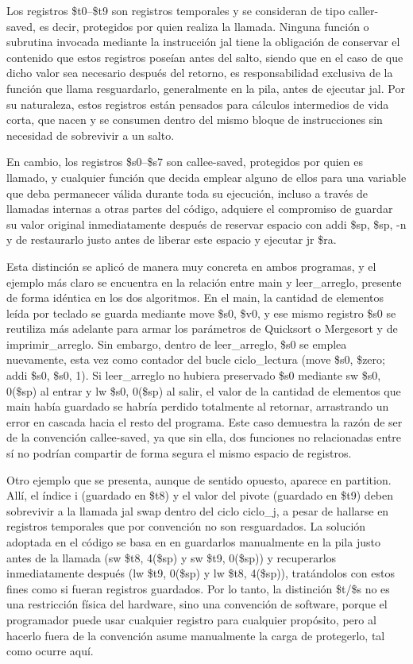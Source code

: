 \documentclass[12pt, letterpaper]{article}
\begin{document}
Los registros \$t0–\$t9 son registros temporales y se consideran de tipo caller-saved, es decir, protegidos por quien realiza la llamada. Ninguna función o subrutina invocada mediante la instrucción jal tiene la obligación de conservar el contenido que estos registros poseían antes del salto, siendo que en el caso de que dicho valor sea necesario después del retorno, es responsabilidad exclusiva de la función que llama resguardarlo, generalmente en la pila, antes de ejecutar jal. Por su naturaleza, estos registros están pensados para cálculos intermedios de vida corta, que nacen y se consumen dentro del mismo bloque de instrucciones sin necesidad de sobrevivir a un salto.

En cambio, los registros \$s0–\$s7 son callee-saved, protegidos por quien es llamado, y cualquier función que decida emplear alguno de ellos para una variable que deba permanecer válida durante toda su ejecución, incluso a través de llamadas internas a otras partes del código, adquiere el compromiso de guardar su valor original inmediatamente después de reservar espacio con addi \$sp, \$sp, -n y de restaurarlo justo antes de liberar este espacio y ejecutar jr \$ra.

Esta distinción se aplicó de manera muy concreta en ambos programas, y el ejemplo más claro se encuentra en la relación entre main y leer\_arreglo, presente de forma idéntica en los dos algoritmos. En el main, la cantidad de elementos leída por teclado se guarda mediante move \$s0, \$v0, y ese mismo registro \$s0 se reutiliza más adelante para armar los parámetros de Quicksort o Mergesort y de imprimir\_arreglo. Sin embargo, dentro de leer\_arreglo, \$s0 se emplea nuevamente, esta vez como contador del bucle ciclo\_lectura (move \$s0, \$zero; addi \$s0, \$s0, 1). Si leer\_arreglo no hubiera preservado \$s0 mediante sw \$s0, 0(\$sp) al entrar y lw \$s0, 0(\$sp) al salir, el valor de la cantidad de elementos que main había guardado se habría perdido totalmente al retornar, arrastrando un error en cascada hacia el resto del programa. Este caso demuestra la razón de ser de la convención callee-saved, ya que sin ella, dos funciones no relacionadas entre sí no podrían compartir de forma segura el mismo espacio de registros.

Otro ejemplo que se presenta, aunque de sentido opuesto, aparece en partition. Allí, el índice i (guardado en \$t8) y el valor del pivote (guardado en \$t9) deben sobrevivir a la llamada jal swap dentro del ciclo ciclo\_j, a pesar de hallarse en registros temporales que por convención no son resguardados. La solución adoptada en el código se basa en en guardarlos manualmente en la pila justo antes de la llamada (sw \$t8, 4(\$sp) y sw \$t9, 0(\$sp)) y recuperarlos inmediatamente después (lw \$t9, 0(\$sp) y lw \$t8, 4(\$sp)), tratándolos con estos fines como si fueran registros guardados. Por lo tanto, la distinción \$t/\$s no es una restricción física del hardware, sino una convención de software, porque el programador puede usar cualquier registro para cualquier propósito, pero al hacerlo fuera de la convención asume manualmente la carga de protegerlo, tal como ocurre aquí.
\end{document}
